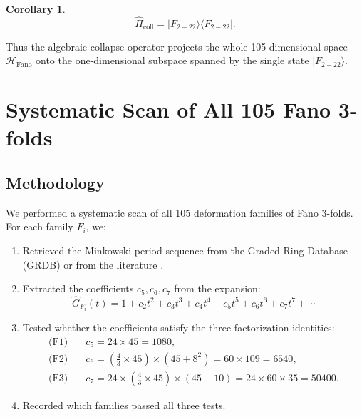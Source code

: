 \documentclass[12pt]{article}
\newtheorem{corollary}{Corollary}
\begin{document}
\begin{corollary}
\begin{equation}
\hat{\Pi}_{\text{coll}} = |F_{2-22}\rangle\langle F_{2-22}|.
\label{eq:projection}
\end{equation}
\end{corollary}

Thus the algebraic collapse operator projects the whole 105‑dimensional space
\(\mathcal{H}_{\text{Fano}}\) onto the one‑dimensional subspace spanned by
the single state \(|F_{2-22}\rangle\).

\section{Systematic Scan of All 105 Fano 3-folds}
\label{sec:scan}

\subsection{Methodology}

We performed a systematic scan of all 105 deformation families of Fano 3-folds.
For each family \(F_i\), we:

\begin{enumerate}
  \item Retrieved the Minkowski period sequence from the Graded Ring Database
        (GRDB) \cite{grdb} or from the literature \cite{coates2013}.
  \item Extracted the coefficients \(c_5, c_6, c_7\) from the expansion:
        \begin{equation}
        \widehat{G}_{F_i}(t) = 1 + c_2 t^2 + c_3 t^3 + c_4 t^4 + c_5 t^5 + c_6 t^6 + c_7 t^7 + \cdots
        \label{eq:expansion}
        \end{equation}
  \item Tested whether the coefficients satisfy the three factorization identities:
        \begin{equation}
        \begin{aligned}
        \text{(F1)}&\quad c_5 = 24 \times 45 = 1080,\\[4pt]
        \text{(F2)}&\quad c_6 = \left(\frac{4}{3} \times 45\right) \times \left(45 + 8^2\right) = 60 \times 109 = 6540,\\[4pt]
        \text{(F3)}&\quad c_7 = 24 \times \left(\frac{4}{3} \times 45\right) \times \left(45 - 10\right) = 24 \times 60 \times 35 = 50400.
        \end{aligned}
        \label{eq:three_tests}
        \end{equation}
  \item Recorded which families passed all three tests.
\end{enumerate}
\end{document}
